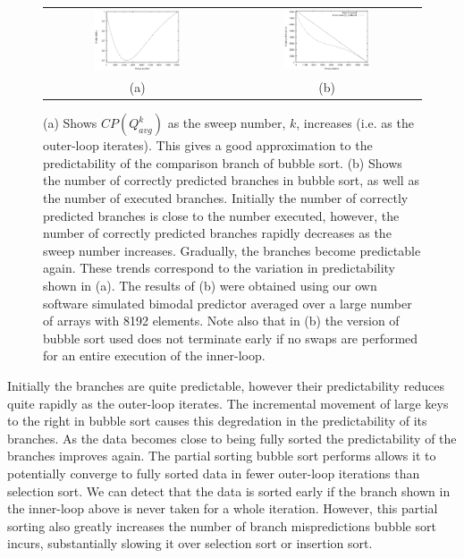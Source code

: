 \documentclass[acmtocl]{acmtrans2m}
\begin{document}
\begin{figure}
\centering
\begin{tabular}{cc}
\includegraphics[width=0.48\textwidth]{plots/bubble_predictability.eps} & \includegraphics[width=0.48\textwidth]{plots/bubble_sweep_misses.eps} \\
(a) & (b) \\
\end{tabular}
\caption{(a) Shows $CP(Q^k_{avg})$ as the sweep number, $k$, increases (i.e. as
the outer-loop iterates). This gives a good approximation to the predictability
of the comparison branch of bubble sort. (b) Shows the number of correctly
predicted branches in bubble sort, as well as the number of executed branches.
Initially the number of correctly predicted branches is close to the number
executed, however, the number of correctly predicted branches rapidly decreases
as the sweep number increases. Gradually, the branches become predictable again.
These trends correspond to the variation in predictability shown in (a). The
results of (b) were obtained using our own software simulated bimodal predictor
averaged over a large number of arrays with 8192 elements. Note also that in (b)
the version of bubble sort used does not terminate early if no swaps are
performed for an entire execution of the inner-loop.  }
\label{bubble_predictability}
\end{figure}

Initially the branches are quite predictable, however their predictability
reduces quite rapidly as the outer-loop iterates.  The incremental movement of
large keys to the right in bubble sort causes this degredation in the
predictability of its branches. As the data becomes close to being fully sorted
the predictability of the branches improves again. The partial sorting bubble
sort performs allows it to potentially converge to fully sorted data in fewer
outer-loop iterations than selection sort. We can detect that the data is sorted
early if the branch shown in the inner-loop above is never taken for a whole
iteration. However, this partial sorting also greatly increases the number of
branch mispredictions bubble sort incurs, substantially slowing it over
selection sort or insertion sort.
\end{document}
